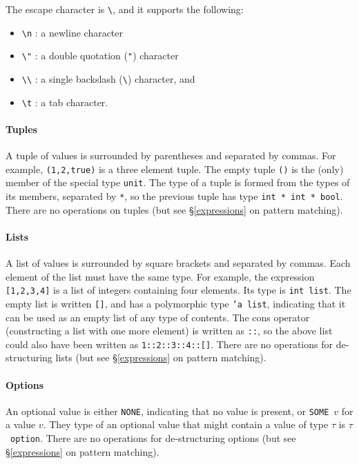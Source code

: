 \documentclass[12pt,a4paper]{book}
\begin{document}
The escape character is \verb|\|, and it supports the following:
\begin{itemize}
\item
\verb|\n| : a newline character
\item 
\verb|\"| : a double quotation (\texttt{"}) character
\item
\verb|\\| : a single backslash (\verb|\|) character, and
\item 
\verb|\t| : a tab character.
\end{itemize}

\paragraph{Tuples} A tuple of values is surrounded by parentheses and separated by commas. For example, \texttt{(1,2,true)} is a three element tuple. The empty tuple \texttt{()} is the (only) member of the special type \texttt{unit}. The type of a tuple is formed from the types of its members, separated by \texttt{*}, so the previous tuple has type \texttt{int * int * bool}. There are no operations on tuples (but see \S\ref{expressions} on pattern matching).

\paragraph{Lists} A list of values is surrounded by square brackets and separated by commas. Each element of the list must have the same type. For example, the expression \texttt{[1,2,3,4]} is a list of integers containing four elements. Its type is \texttt{int list}. The empty list is written \texttt{[]}, and has a polymorphic type \texttt{'a list}, indicating that it can be used as an empty list of any type of contents. The cons operator (constructing a list with one more element) is written as \texttt{::}, so the above list could also have been written as \texttt{1::2::3::4::[]}. There are no operations for de-structuring lists (but see \S\ref{expressions} on pattern matching).

\paragraph{Options} An optional value is either \texttt{NONE}, indicating that no value is present, or \texttt{SOME}\ $v$ for a value $v$. They type of an optional value that might contain a value of type $\tau$ is $\tau$\ \texttt{option}. There are no operations for de-structuring options (but see \S\ref{expressions} on pattern matching).
\end{document}
